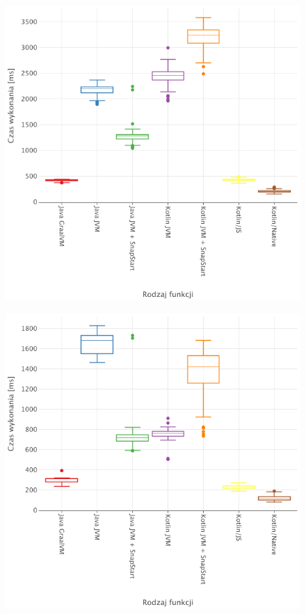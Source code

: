 \begin{figure}[htbp]
    \centering %
    \begin{minipage}[t]{0.48\textwidth} %
        \centering %
        \includegraphics[width=\linewidth]{charts/results/cold-start-boxplot-256.png}
        \label{fig:cold_start_128} %
    \end{minipage}%
    \hfill %
    \begin{minipage}[t]{0.48\textwidth}
        \centering
        \includegraphics[width=\linewidth]{charts/results/cold-start-boxplot-1024.png}

\end{minipage}
\end{figure}
